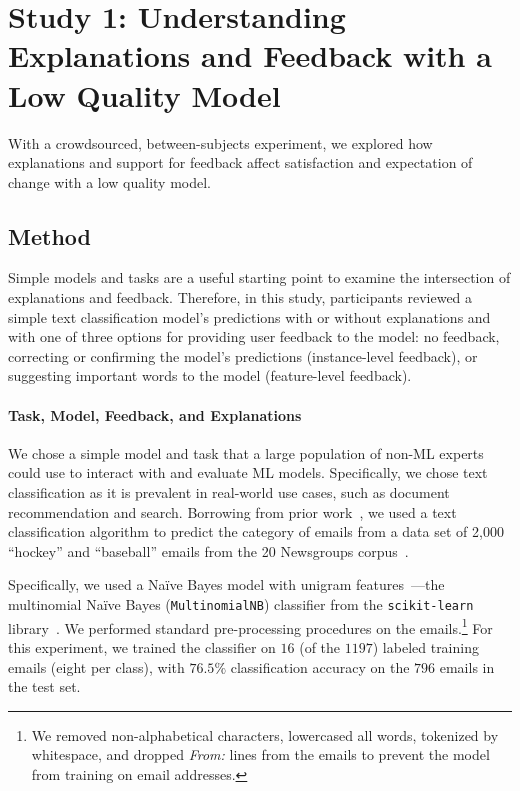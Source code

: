 

\section{Study 1: Understanding Explanations and Feedback with a Low Quality Model} 
With a crowdsourced, between-subjects experiment, we explored how explanations and support for feedback affect satisfaction and expectation of change with a low quality model. 

\subsection{Method}
Simple models and tasks are a useful starting point to examine the intersection of explanations and feedback.
Therefore, in this study, participants reviewed a simple text classification
model's predictions with or without explanations and with one of three options for providing user feedback to the model: no feedback, correcting or confirming the model's predictions (instance-level feedback), or suggesting important words to the model (feature-level feedback). 

\paragraph{Task, Model, Feedback, and Explanations}
We chose a simple model and task that a large population of non-ML experts could use to interact with and evaluate ML models.
%
Specifically, we chose text classification as it is prevalent in real-world use cases, such as document recommendation and search. Borrowing from prior work~\cite{Kulesza2015PrinciplesLearning, Settles2011ClosingInstances}, we used a text classification algorithm to predict the category of emails from a data set of 2,000 ``hockey'' and ``baseball'' emails from the 20 Newsgroups corpus~\cite{Lang1995NewsWeeder:Netnews}. 

Specifically, we used a Na\"ive Bayes model with unigram features~\cite{Lewis1998NaiveBayesatRetrieval}---the multinomial Na\"ive Bayes (\texttt{MultinomialNB}) classifier from the \texttt{scikit-learn} library~\cite{Pedregosa2011Scikit-learn:Python}.
%
We performed standard pre-processing procedures on the emails.\footnote{We removed non-alphabetical characters, lowercased all words, tokenized by whitespace, and dropped \textit{From:} lines from the emails to prevent the model from training on email addresses.} For this experiment, we trained the classifier on $16$ (of the $1197$) labeled training emails (eight per class), with $76.5\%$ classification accuracy on the $796$ emails in the test set.

